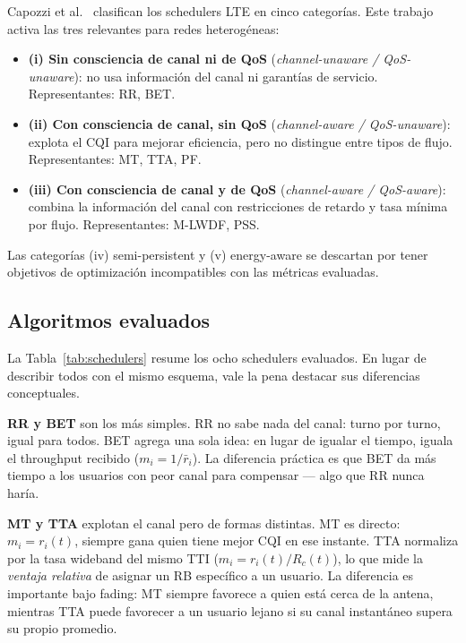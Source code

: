 \documentclass[conference]{IEEEtran}
\begin{document}
Capozzi et al.~\cite{capozzi2012} clasifican los schedulers LTE en cinco categorías.
Este trabajo activa las tres relevantes para redes heterogéneas:

\begin{itemize}
  \item \textbf{(i) Sin consciencia de canal ni de QoS} (\emph{channel-unaware /
        QoS-unaware}): no usa información del canal ni garantías de servicio.
        Representantes: RR, BET.
  \item \textbf{(ii) Con consciencia de canal, sin QoS} (\emph{channel-aware /
        QoS-unaware}): explota el CQI para mejorar eficiencia, pero no distingue
        entre tipos de flujo. Representantes: MT, TTA, PF.
  \item \textbf{(iii) Con consciencia de canal y de QoS} (\emph{channel-aware /
        QoS-aware}): combina la información del canal con restricciones de retardo
        y tasa mínima por flujo. Representantes: M-LWDF, PSS.
\end{itemize}

Las categorías (iv) semi-persistent y (v) energy-aware se descartan por tener
objetivos de optimización incompatibles con las métricas evaluadas.

\subsection{Algoritmos evaluados}

La Tabla~\ref{tab:schedulers} resume los ocho schedulers evaluados. En lugar de
describir todos con el mismo esquema, vale la pena destacar sus diferencias conceptuales.

\textbf{RR y BET} son los más simples. RR no sabe nada del canal: turno por turno,
igual para todos. BET agrega una sola idea: en lugar de igualar el tiempo, iguala el
throughput recibido ($m_i = 1/\bar{r}_i$). La diferencia práctica es que BET da más
tiempo a los usuarios con peor canal para compensar --- algo que RR nunca haría.

\textbf{MT y TTA} explotan el canal pero de formas distintas. MT es directo:
$m_i = r_i(t)$, siempre gana quien tiene mejor CQI en ese instante. TTA normaliza
por la tasa wideband del mismo TTI ($m_i = r_i(t)/R_c(t)$), lo que mide la
\emph{ventaja relativa} de asignar un RB específico a un usuario. La diferencia
es importante bajo fading: MT siempre favorece a quien está cerca de la antena,
mientras TTA puede favorecer a un usuario lejano si su canal instantáneo supera
su propio promedio.
\end{document}

